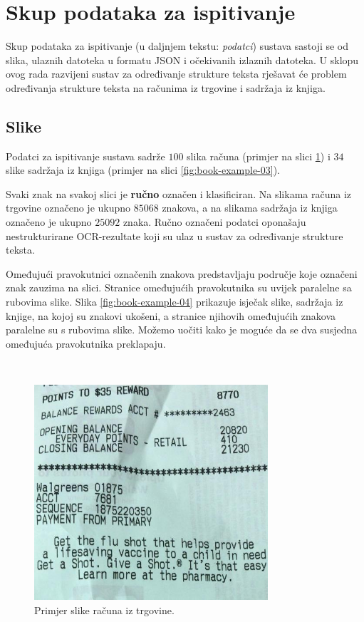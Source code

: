 \documentclass[times, utf8, zavrsni]{fer}
\begin{document}
\section{Skup podataka za ispitivanje}
\label{sec:skup-podataka-za-ispitivanje}
Skup podataka za ispitivanje (u daljnjem tekstu: \emph{podatci})
sustava sastoji se od slika, ulaznih datoteka u formatu JSON i
očekivanih izlaznih datoteka. U sklopu ovog rada razvijeni sustav za
određivanje strukture teksta rješavat će problem određivanja strukture teksta
na računima iz trgovine i sadržaja iz knjiga.




\subsection{Slike}
\label{subsec:slike}
Podatci za ispitivanje sustava sadrže $100$ slika računa (primjer na slici
\ref{fig:receipt-example-04}) i $34$ slike sadržaja iz knjiga (primjer na slici
\ref{fig:book-example-03}).

Svaki znak na svakoj slici je \textbf{ručno} označen i klasificiran. Na slikama
računa iz trgovine označeno je ukupno $85068$ znakova, a na slikama sadržaja iz
knjiga označeno je ukupno $25092$ znaka. Ručno označeni podatci oponašaju
nestrukturirane OCR-rezultate koji su ulaz u sustav za određivanje strukture
teksta.

Omeđujući pravokutnici označenih znakova predstavljaju područje koje označeni
znak zauzima na slici. Stranice omeđujućih pravokutnika su uvijek paralelne sa
rubovima slike. Slika \ref{fig:book-example-04} prikazuje isječak slike,
sadržaja iz knjige, na kojoj su znakovi ukošeni, a stranice njihovih omeđujućih
znakova paralelne su s rubovima slike. Možemo uočiti kako je moguće da se dva
susjedna omeđujuća pravokutnika preklapaju.

\

\begin{figure}[!htb]
    \centering
    \captionsetup{justification=centering,margin=2cm}
    \includegraphics[height=8cm]{images/receipt-example-04.jpg}
    \caption{Primjer slike računa iz trgovine.}
    \label{fig:receipt-example-04}
\end{figure}
\end{document}
